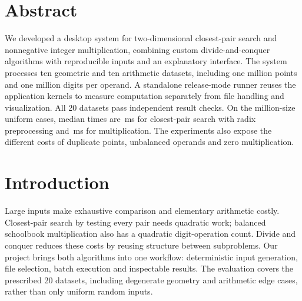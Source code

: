 \documentclass[10pt,a4paper,twocolumn]{article}
\begin{document}

\section*{Abstract}
We developed a desktop system for two-dimensional closest-pair search and nonnegative integer multiplication, combining custom divide-and-conquer algorithms with reproducible inputs and an explanatory interface. The system processes ten geometric and ten arithmetic datasets, including one million points and one million digits per operand. A standalone release-mode runner reuses the application kernels to measure computation separately from file handling and visualization. All 20 datasets pass independent result checks. On the million-size uniform cases, median times are \CPMillionRadix\,ms for closest-pair search with radix preprocessing and \IMMillion\,ms for multiplication. The experiments also expose the different costs of duplicate points, unbalanced operands and zero multiplication.

\section{Introduction}
Large inputs make exhaustive comparison and elementary arithmetic costly. Closest-pair search by testing every pair needs quadratic work; balanced schoolbook multiplication also has a quadratic digit-operation count. Divide and conquer reduces these costs by reusing structure between subproblems. Our project brings both algorithms into one workflow: deterministic input generation, file selection, batch execution and inspectable results. The evaluation covers the prescribed 20 datasets, including degenerate geometry and arithmetic edge cases, rather than only uniform random inputs.
\end{document}
